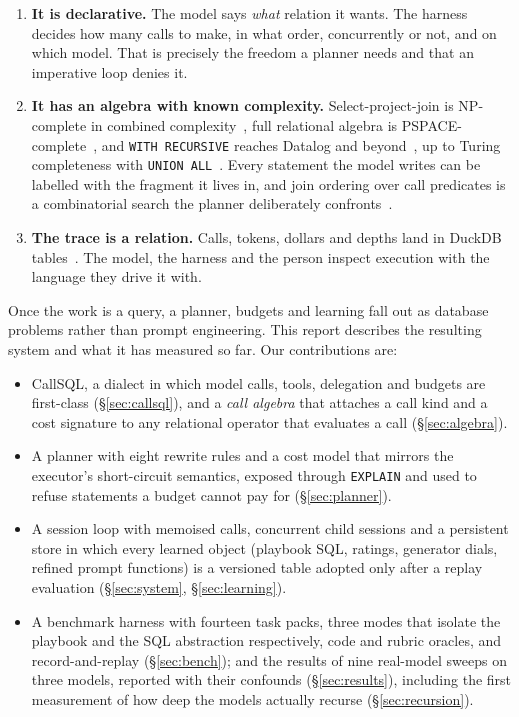 \documentclass[11pt,a4paper]{article}
\newcommand{\callsql}{CallSQL}
\newcommand{\code}[1]{\texttt{#1}}
\begin{document}
\begin{enumerate}[leftmargin=1.5em,itemsep=2pt]
\item \textbf{It is declarative.} The model says \emph{what} relation it wants.
  The harness decides how many calls to make, in what order, concurrently or not,
  and on which model. That is precisely the freedom a planner needs and that an
  imperative loop denies it.
\item \textbf{It has an algebra with known complexity.} Select-project-join is
  NP-complete in combined complexity~\citep{chandra1977conjunctive}, full
  relational algebra is PSPACE-complete~\citep{vardi1982complexity}, and
  \code{WITH RECURSIVE} reaches Datalog and beyond~\citep{dantsin2001complexity},
  up to Turing completeness with \code{UNION ALL}~\citep{gierth2010cyclic}. Every
  statement the model writes can be labelled with the fragment it lives in, and
  join ordering over call predicates is a combinatorial search the planner
  deliberately confronts~\citep{ibaraki1984optimal}.
\item \textbf{The trace is a relation.} Calls, tokens, dollars and depths land in
  DuckDB tables~\citep{raasveldt2019duckdb}. The model, the harness and the
  person inspect execution with the language they drive it with.
\end{enumerate}

Once the work is a query, a planner, budgets and learning fall out as database
problems rather than prompt engineering. This report describes the resulting
system and what it has measured so far. Our contributions are:

\begin{itemize}[leftmargin=1.5em,itemsep=2pt]
\item \callsql{}, a dialect in which model calls, tools, delegation and budgets
  are first-class (\S\ref{sec:callsql}), and a \emph{call algebra} that
  attaches a call kind and a cost signature to any relational operator that
  evaluates a call (\S\ref{sec:algebra}).
\item A planner with eight rewrite rules and a cost model that mirrors the
  executor's short-circuit semantics, exposed through \code{EXPLAIN} and used
  to refuse statements a budget cannot pay for (\S\ref{sec:planner}).
\item A session loop with memoised calls, concurrent child sessions and a
  persistent store in which every learned object (playbook SQL, ratings,
  generator dials, refined prompt functions) is a versioned table adopted
  only after a replay evaluation (\S\ref{sec:system}, \S\ref{sec:learning}).
\item A benchmark harness with fourteen task packs, three modes that isolate
  the playbook and the SQL abstraction respectively, code and rubric
  oracles, and record-and-replay (\S\ref{sec:bench}); and the results of
  nine real-model sweeps on three models, reported with their confounds
  (\S\ref{sec:results}), including the first measurement of how deep the
  models actually recurse (\S\ref{sec:recursion}).
\end{itemize}
\end{document}
